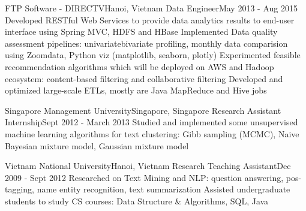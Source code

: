     \resumeSubheading
      {FTP Software - DIRECTV}{Hanoi, Vietnam}
      {Data Engineer}{May 2013 - Aug 2015}
      \resumeItemListStart
          {Developed RESTful Web Services to provide data analytics results to end-user interface using Spring MVC, HDFS and HBase}
          {Implemented Data quality assessment pipelines: univariate\/bivariate profiling, monthly data comparision using Zoomdata, Python viz (matplotlib, seaborn, plotly)}
          {Experimented feasible recommendation algorithms which will be deployed on AWS and Hadoop ecosystem: content-based filtering and collaborative filtering}
          {Developed and optimized large-scale ETLs, mostly are Java MapReduce and Hive jobs}
      \resumeItemListEnd

    \resumeSubheading
      {Singapore Management University}{Singapore, Singapore}
      {Research Assistant Internship}{Sept 2012 - March 2013}
      \resumeItemListStart
          {Studied and implemented some unsupervised machine learning algorithms for text clustering: Gibb sampling (MCMC), Naive Bayesian mixture model, Gaussian mixture model}
      \resumeItemListEnd

    \resumeSubheading
      {Vietnam National University}{Hanoi, Vietnam}
      {Research Teaching Assistant}{Dec 2009 - Sept 2012}
      \resumeItemListStart
          {Researched on Text Mining and NLP: question answering, pos-tagging, name entity recognition, text summarization}
          {Assisted undergraduate students to study CS courses: Data Structure \& Algorithms, SQL, Java}
      \resumeItemListEnd

  \resumeSubHeadingListEnd
